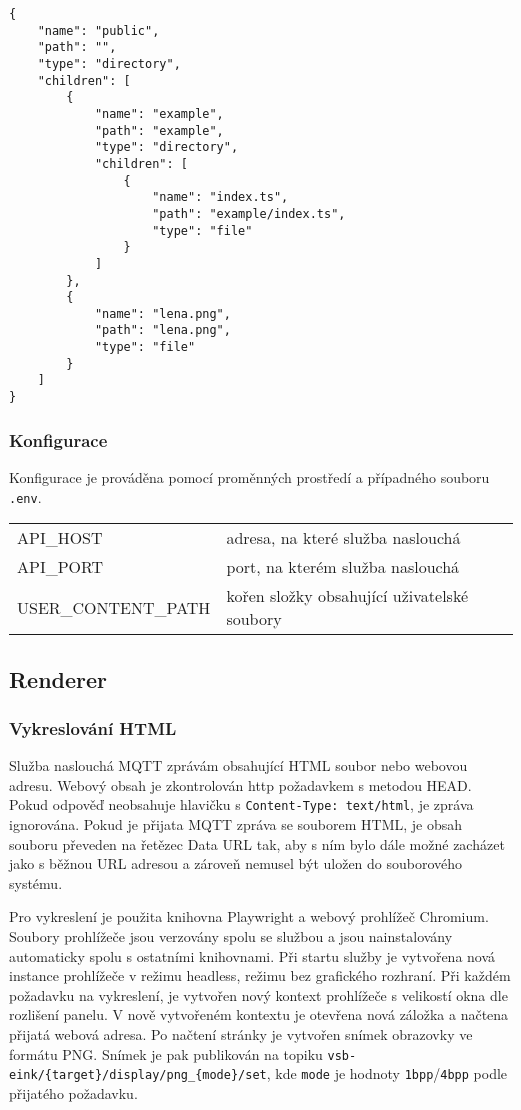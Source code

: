 \begin{lstlisting}[label=src:get-files-response,caption={Odpověď na dotaz GET /core/files/}]
{
    "name": "public",
    "path": "",
    "type": "directory",
    "children": [
        {
            "name": "example",
            "path": "example",
            "type": "directory",
            "children": [
                {
                    "name": "index.ts",
                    "path": "example/index.ts",
                    "type": "file"
                }
            ]
        },
        {
            "name": "lena.png",
            "path": "lena.png",
            "type": "file"
        }
    ]
}
\end{lstlisting}

\subsubsection{Konfigurace}
Konfigurace je prováděna pomocí proměnných prostředí a případného souboru \lstinline{.env}.

\begin{table}[h]
    \begin{tabular}{ll}
        API\_HOST & adresa, na které služba naslouchá \\
        API\_PORT & port, na kterém služba naslouchá \\
        USER\_CONTENT\_PATH & kořen složky obsahující uživatelské soubory \\
    \end{tabular}
\end{table}

\vfill

\subsection{Renderer}
\subsubsection{Vykreslování HTML}
Služba naslouchá MQTT zprávám obsahující HTML soubor nebo webovou adresu. Webový obsah je zkontrolován http požadavkem s metodou HEAD. Pokud odpověď neobsahuje hlavičku s \lstinline|Content-Type: text/html|, je zpráva ignorována. Pokud je přijata MQTT zpráva se souborem HTML, je obsah souboru převeden na řetězec Data URL tak, aby s ním bylo dále možné zacházet jako s běžnou URL adresou a zároveň nemusel být uložen do souborového systému.

Pro vykreslení je použita knihovna Playwright a webový prohlížeč Chromium. Soubory prohlížeče jsou verzovány spolu se službou a jsou nainstalovány automaticky spolu s ostatními knihovnami. Při startu služby je vytvořena nová instance prohlížeče v režimu headless, režimu bez grafického rozhraní. Při každém požadavku na vykreslení, je vytvořen nový kontext prohlížeče s velikostí okna dle rozlišení panelu. V nově vytvořeném kontextu je otevřena nová záložka a načtena přijatá webová adresa. Po načtení stránky je vytvořen snímek obrazovky ve formátu PNG. Snímek je pak publikován na topiku \lstinline|vsb-eink/{target}/display/png_{mode}/set|, kde \lstinline|mode| je hodnoty \lstinline|1bpp|/\lstinline|4bpp| podle přijatého požadavku.


